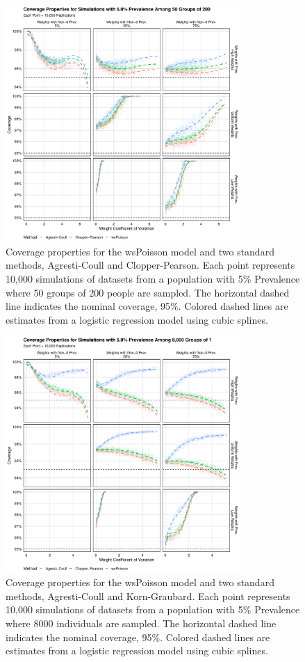 \documentclass[AMA,STIX1COL]{WileyNJD-v2}
\begin{document}
\begin{figure}
\centering
\includegraphics[width=0.8\textwidth]{figures/perfect_coverage_50_groups_0_05_prev.pdf}
\caption{Coverage properties for the wsPoisson model and two standard methods, Agresti-Coull and Clopper-Pearson.
Each point represents 10,000 simulations of datasets from a population with 5\% Prevalence where 50 groups of 200 people are sampled.
The horizontal dashed line indicates the nominal coverage, 95\%.
Colored dashed lines are estimates from a logistic regression model using cubic splines.}
\label{fig:perfect_coverage_50_groups_0_05_prev}
\end{figure}

\begin{figure}
\centering
\includegraphics[width=0.8\textwidth]{figures/perfect_coverage_8000_groups_0_05_prev.pdf}
\caption{Coverage properties for the wsPoisson model and two standard methods, Agresti-Coull and Korn-Graubard.
Each point represents 10,000 simulations of datasets from a population with 5\% Prevalence where 8000 individuals are sampled.
The horizontal dashed line indicates the nominal coverage, 95\%.
Colored dashed lines are estimates from a logistic regression model using cubic splines.}
\label{fig:perfect_coverage_8000_groups_0_05_prev}
\end{figure}
\end{document}
